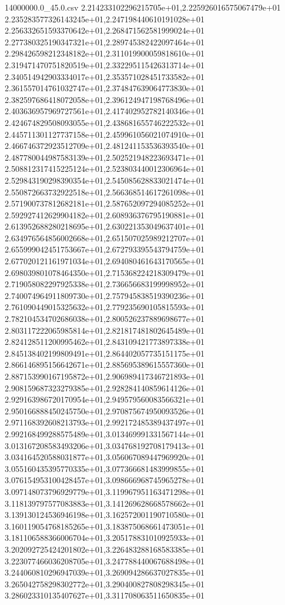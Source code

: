 \begin{filecontents*}{14000000.0_45.0.csv}
2.214233102296215705e+01,2.225926016575067479e+01
2.235283577326143245e+01,2.247198440610191028e+01
2.256332651593370642e+01,2.268471562581999024e+01
2.277380325190347321e+01,2.289745382422097464e+01
2.298426598212348182e+01,2.311019900059818610e+01
2.319471470751820519e+01,2.332295115426313714e+01
2.340514942903334017e+01,2.353571028451733582e+01
2.361557014761032747e+01,2.374847639064773830e+01
2.382597686418072058e+01,2.396124947198768496e+01
2.403636957969727561e+01,2.417402952782140346e+01
2.424674829508093055e+01,2.438681655746222532e+01
2.445711301127737158e+01,2.459961056021074910e+01
2.466746372923512709e+01,2.481241153536393540e+01
2.487780044987583139e+01,2.502521948223693471e+01
2.508812317415225124e+01,2.523803440012306964e+01
2.529843190298390354e+01,2.545085628833021474e+01
2.550872663732922518e+01,2.566368514617261098e+01
2.571900737812682181e+01,2.587652097294085252e+01
2.592927412629904182e+01,2.608936376795190881e+01
2.613952688280218695e+01,2.630221353049637401e+01
2.634976564856002668e+01,2.651507025989212707e+01
2.655999042451753667e+01,2.672793395543794759e+01
2.677020121161971034e+01,2.694080461643170565e+01
2.698039801078464350e+01,2.715368224218309479e+01
2.719058082297925338e+01,2.736656683199998952e+01
2.740074964911809730e+01,2.757945838519390236e+01
2.761090449015325632e+01,2.779235690105815593e+01
2.782104534702686038e+01,2.800526237889698677e+01
2.803117222065985814e+01,2.821817481802645489e+01
2.824128511200995462e+01,2.843109421773897338e+01
2.845138402199809491e+01,2.864402057735151175e+01
2.866146895156642671e+01,2.885695389615557360e+01
2.887153990167195872e+01,2.906989417346721893e+01
2.908159687323279385e+01,2.928284140859614126e+01
2.929163986720170954e+01,2.949579560083566321e+01
2.950166888450245750e+01,2.970875674950093526e+01
2.971168392608213793e+01,2.992172485389437497e+01
2.992168499288575489e+01,3.013469991331567144e+01
3.013167208583493206e+01,3.034768192708179413e+01
3.034164520588031877e+01,3.056067089447969920e+01
3.055160435395770335e+01,3.077366681483999855e+01
3.076154953100428457e+01,3.098666968745965278e+01
3.097148073796929779e+01,3.119967951163471298e+01
3.118139797577083883e+01,3.141269628668578662e+01
3.139130124536946198e+01,3.162572001190710580e+01
3.160119054768185265e+01,3.183875068661473051e+01
3.181106588366006704e+01,3.205178831010925933e+01
3.202092725424201802e+01,3.226483288168583385e+01
3.223077466036208705e+01,3.247788440067688498e+01
3.244060810296947039e+01,3.269094286637027835e+01
3.265042758298302772e+01,3.290400827808298345e+01
3.286023310135407627e+01,3.311708063511650835e+01

\end{filecontents*}
